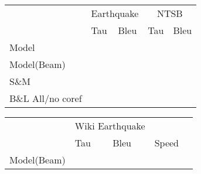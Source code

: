 
\begin{table*}
  \centering
  \begin{tabular}{|l|ll|ll|}
    \hline
    & \multicolumn{2}{c|}{Earthquake} & \multicolumn{2}{c|}{NTSB} \\
    & Tau & Bleu & Tau & Bleu \\
    \hline
    Model & & \\
    Model(Beam) & & \\
    S\&M & & \\
    B\&L All/no coref & & \\
    \hline
  \end{tabular}
\end{table*}


\begin{table*}
  \centering
  \begin{tabular}{|l|ll|ll|}
    \hline
    & \multicolumn{2}{c|}{Wiki Earthquake} \\
    & Tau & Bleu & Speed & \\
    \hline
    Model(Beam) & & \\
    \hline
  \end{tabular}
\end{table*}

